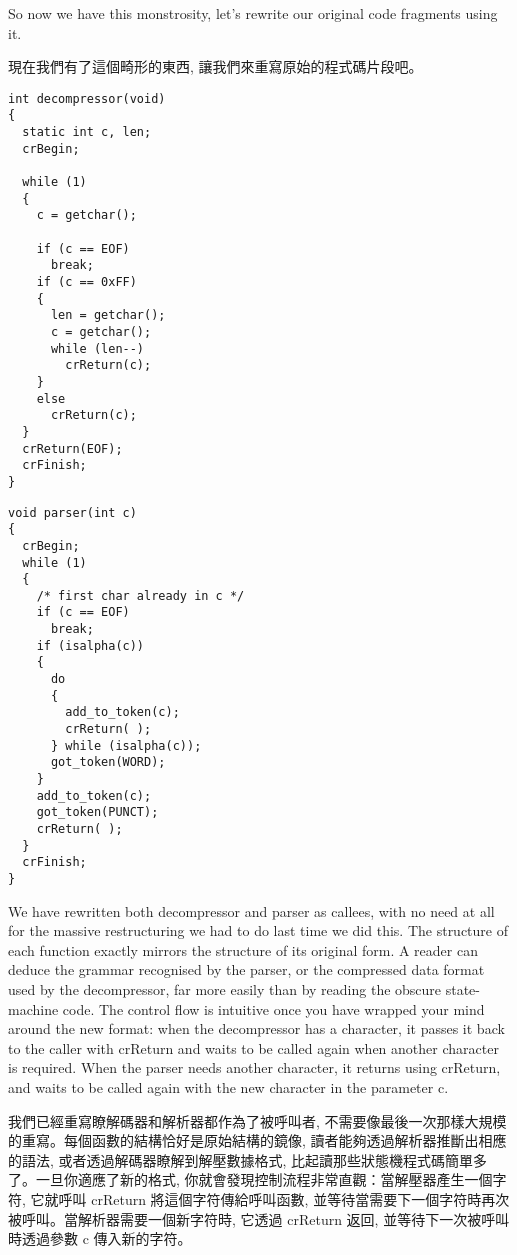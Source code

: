 \documentclass[12pt]{article}
\begin{document}
\begin{CJK}{UTF8}{bsmi}
So now we have this monstrosity, let's rewrite our original code fragments using it.

現在我們有了這個畸形的東西, 讓我們來重寫原始的程式碼片段吧。 

\newpage
\begin{multicols}{2}
\begin{lstlisting}[caption=decompressor, basicstyle=\footnotesize, breaklines=true]
int decompressor(void) 
{
  static int c, len;
  crBegin;

  while (1) 
  {
    c = getchar();

    if (c == EOF)
      break;
    if (c == 0xFF) 
    {
      len = getchar();
      c = getchar();
      while (len--)
        crReturn(c);
    } 
    else
      crReturn(c);
  }
  crReturn(EOF);
  crFinish;
}
\end{lstlisting}


\begin{lstlisting}[caption=parser, basicstyle=\footnotesize, breaklines=true]
void parser(int c) 
{
  crBegin;
  while (1) 
  {
    /* first char already in c */
    if (c == EOF)
      break;
    if (isalpha(c)) 
    {
      do 
      {
        add_to_token(c);
        crReturn( );
      } while (isalpha(c));
      got_token(WORD);
    }
    add_to_token(c);
    got_token(PUNCT);
    crReturn( );
  }
  crFinish;
}
\end{lstlisting}
\end{multicols}

We have rewritten both decompressor and parser as callees, with no need at all for the massive restructuring we had to do last time we did this. The structure of each function exactly mirrors the structure of its original form. A reader can deduce the grammar recognised by the parser, or the compressed data format used by the decompressor, far more easily than by reading the obscure state-machine code. The control flow is intuitive once you have wrapped your mind around the new format: when the decompressor has a character, it passes it back to the caller with crReturn and waits to be called again when another character is required. When the parser needs another character, it returns using crReturn, and waits to be called again with the new character in the parameter c.

我們已經重寫瞭解碼器和解析器都作為了被呼叫者, 不需要像最後一次那樣大規模的重寫。每個函數的結構恰好是原始結構的鏡像, 讀者能夠透過解析器推斷出相應的語法, 或者透過解碼器瞭解到解壓數據格式, 比起讀那些狀態機程式碼簡單多了。一旦你適應了新的格式, 你就會發現控制流程非常直觀：當解壓器產生一個字符, 它就呼叫 crReturn 將這個字符傳給呼叫函數, 並等待當需要下一個字符時再次被呼叫。當解析器需要一個新字符時, 它透過
crReturn 返回, 並等待下一次被呼叫時透過參數 c 傳入新的字符。


\end{CJK}
\end{document}
